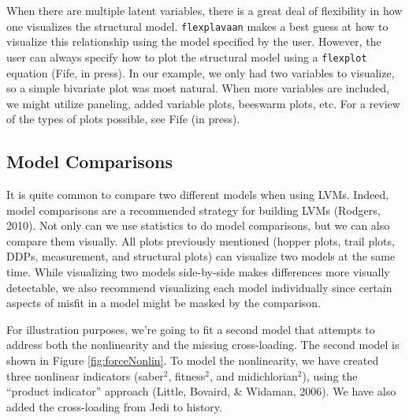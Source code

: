 \documentclass[
  english,
  man]{apa6}
\begin{document}
When there are multiple latent variables, there is a great deal of flexibility in how one visualizes the structural model. \texttt{flexplavaan} makes a best guess at how to visualize this relationship using the model specified by the user. However, the user can always specify how to plot the structural model using a \texttt{flexplot} equation (Fife, in press). In our example, we only had two variables to visualize, so a simple bivariate plot was most natural. When more variables are included, we might utilize paneling, added variable plots, beeswarm plots, etc. For a review of the types of plots possible, see Fife (in press).

\hypertarget{model-comparisons}{%
\subsection{Model Comparisons}\label{model-comparisons}}

It is quite common to compare two different models when using LVMs. Indeed, model comparisons are a recommended strategy for building LVMs (Rodgers, 2010). Not only can we use statistics to do model comparisons, but we can also compare them visually. All plots previously mentioned (hopper plots, trail plots, DDPs, measurement, and structural plots) can visualize two models at the same time. While visualizing two models side-by-side makes differences more visually detectable, we also recommend visualizing each model individually since certain aspects of misfit in a model might be masked by the comparison.

For illustration purposes, we're going to fit a second model that attempts to address both the nonlinearity and the missing cross-loading. The second model is shown in Figure \ref{fig:forceNonlin}. To model the nonlinearity, we have created three nonlinear indicators (saber\(^2\), fitness\(^2\), and midichlorian\(^2\)), using the ``product indicator'' approach (Little, Bovaird, \& Widaman, 2006). We have also added the cross-loading from Jedi to history.
\end{document}
